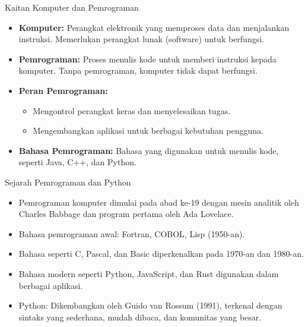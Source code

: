 \documentclass[aspectratio=169, table]{beamer}
\begin{document}
\begin{frame}{Kaitan Komputer dan Pemrograman}
	\begin{itemize}
		\item \textbf{Komputer:} Perangkat elektronik yang memproses data dan menjalankan instruksi. Memerlukan perangkat lunak (software) untuk berfungsi.
		\item \textbf{Pemrograman:} Proses menulis kode untuk memberi instruksi kepada komputer. Tanpa pemrograman, komputer tidak dapat berfungsi.
		\item \textbf{Peran Pemrograman:}
		\begin{itemize}
			\item Mengontrol perangkat keras dan menyelesaikan tugas.
			\item Mengembangkan aplikasi untuk berbagai kebutuhan pengguna.
		\end{itemize}
		\item \textbf{Bahasa Pemrograman:} Bahasa yang digunakan untuk menulis kode, seperti Java, C++, dan Python.
	\end{itemize}
\end{frame}


\begin{frame}[fragile]{Sejarah Pemrograman dan Python}
\begin{itemize}
\item Pemrograman komputer dimulai pada abad ke-19 dengan mesin analitik oleh Charles Babbage dan program pertama oleh Ada Lovelace.
\item Bahasa pemrograman awal: Fortran, COBOL, Lisp (1950-an).
\item Bahasa seperti C, Pascal, dan Basic diperkenalkan pada 1970-an dan 1980-an.
\item Bahasa modern seperti Python, JavaScript, dan Rust digunakan dalam berbagai aplikasi.
\item Python: Dikembangkan oleh Guido van Rossum (1991), terkenal dengan sintaks yang sederhana, mudah dibaca, dan komunitas yang besar.
\end{itemize}
\end{frame}
\end{document}
